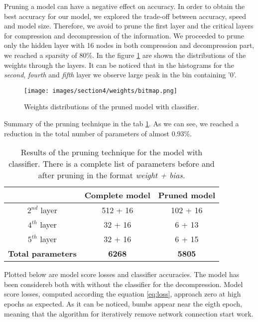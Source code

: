 \documentclass{article}
\begin{document}
\par Pruning a model can have a negative effect on accuracy. 
In order to obtain the best accuracy for our model, we explored the trade-off between accuracy, speed and model size.
Therefore, we avoid to prune the first layer and the critical layers for compression and decompression of the information.
We proceeded to prune only the hidden layer with 16 nodes in both compression and decompression part, we reached a sparsity of 80\%. 
In the figure \ref{fig:weights} are shown the distributions of the weights through the layers.
It can be noticed that in the histograms for the \textit{second}, \textit{fourth} and \textit{fifth} layer we observe large peak in the bin containing '$0$'.

\begin{figure}[H]
  \centering
  \texttt{[image: images/section4/weights/bitmap.png]}
  \caption{Weights distributions of the pruned model with classifier.}
  \label{fig:weights}
\end{figure}

Summary of the pruning technique in the tab \ref{tab:params}. 
As we can see, we reached a reduction in the total number of parameters of almost 0.93\%.

\begin{table} [H]
  \centering
  \begin{tabular}{| c | c | c |}
  
  \hline
  & Complete model  &   Pruned model  \\
  \hline 
  \hline
  $2^{nd}$ layer & 512 + 16 & 102 + 16 \\ %
  \hline
  $4^{th}$ layer & 32 + 16 & 6 + 13 \\ %
  \hline
  $5^{th}$ layer & 32 + 16 & 6 + 15  \\ %
  \hline
  \textbf{Total parameters} & \textbf{6268} & \textbf{5805} \\
  \hline
  \end{tabular}
  \caption{Results of the pruning technique for the model with classifier.
  There is a complete list of parameters before and after pruning in the format \textit{weight + bias}.}
  \label{tab:params}
\end{table} 

Plotted below are model score losses and classifier accuracies. 
The model has been considereb both with without the classifier for the decompression.
Model score losses, computed according the equation \ref{eq:loss}, approach zero at high epochs as expected.
As it can be noticed, bumbs appear near the eigth epoch, meaning that the algorithm for iteratively remove network connection start work.
\end{document}
